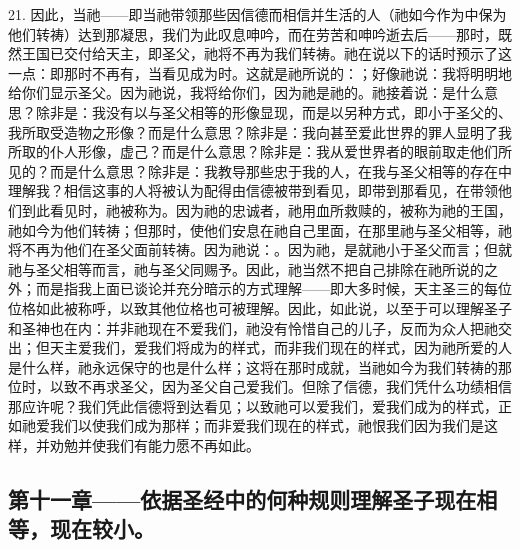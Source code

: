 21. 因此，当祂——即当祂带领那些因信德而相信并生活的人（祂如今作为中保为他们转祷）达到那凝思，我们为此叹息呻吟，而在劳苦和呻吟逝去后——那时，既然王国已交付给天主，即圣父，祂将不再为我们转祷。祂在说以下的话时预示了这一点：即那时不再有，当看见成为时。这就是祂所说的：；好像祂说：我将明明地给你们显示圣父。因为祂说，我将给你们，因为祂是祂的。祂接着说：是什么意思？除非是：我没有以与圣父相等的形像显现，而是以另种方式，即小于圣父的、我所取受造物之形像？而是什么意思？除非是：我向甚至爱此世界的罪人显明了我所取的仆人形像，虚己？而是什么意思？除非是：我从爱世界者的眼前取走他们所见的？而是什么意思？除非是：我教导那些忠于我的人，在我与圣父相等的存在中理解我？相信这事的人将被认为配得由信德被带到看见，即带到那看见，在带领他们到此看见时，祂被称为。因为祂的忠诚者，祂用血所救赎的，被称为祂的王国，祂如今为他们转祷；但那时，使他们安息在祂自己里面，在那里祂与圣父相等，祂将不再为他们在圣父面前转祷。因为祂说：。因为祂，是就祂小于圣父而言；但就祂与圣父相等而言，祂与圣父同赐予。因此，祂当然不把自己排除在祂所说的之外；而是指我上面已谈论并充分暗示的方式理解——即大多时候，天主圣三的每位位格如此被称呼，以致其他位格也可被理解。因此，如此说，以至于可以理解圣子和圣神也在内：并非祂现在不爱我们，祂没有怜惜自己的儿子，反而为众人把祂交出；但天主爱我们，爱我们将成为的样式，而非我们现在的样式，因为祂所爱的人是什么样，祂永远保守的也是什么样；这将在那时成就，当祂如今为我们转祷的那位时，以致不再求圣父，因为圣父自己爱我们。但除了信德，我们凭什么功绩相信那应许呢？我们凭此信德将到达看见；以致祂可以爱我们，爱我们成为的样式，正如祂爱我们以使我们成为那样；而非爱我们现在的样式，祂恨我们因为我们是这样，并劝勉并使我们有能力愿不再如此。\par


\subsection{第十一章——依据圣经中的何种规则理解圣子现在相等，现在较小。}

